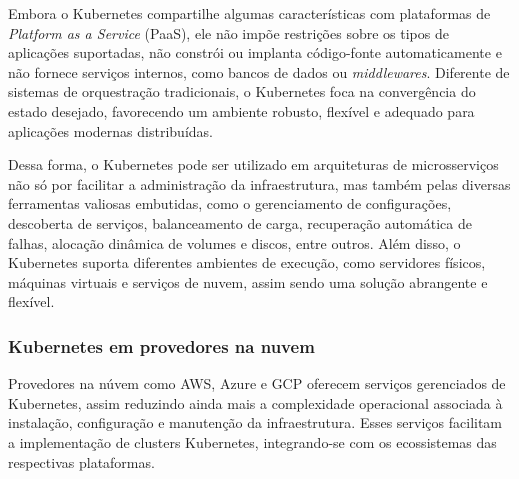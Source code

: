 Embora o Kubernetes compartilhe algumas características com plataformas de \emph{Platform as a Service} (PaaS), ele não impõe restrições sobre os tipos de aplicações suportadas, não constrói ou implanta código-fonte automaticamente e não fornece serviços internos, como bancos de dados ou \emph{middlewares}. Diferente de sistemas de orquestração tradicionais, o Kubernetes foca na convergência do estado desejado, favorecendo um ambiente robusto, flexível e adequado para aplicações modernas distribuídas.  \cite{kubernetes}

Dessa forma, o Kubernetes pode ser utilizado em arquiteturas de microsserviços não só por facilitar a administração da infraestrutura, mas também pelas diversas ferramentas valiosas embutidas, como o gerenciamento de configurações, descoberta de serviços, balanceamento de carga, recuperação automática de falhas, alocação dinâmica de volumes e discos, entre outros. Além disso, o Kubernetes suporta diferentes ambientes de execução, como servidores físicos, máquinas virtuais e serviços de nuvem, assim sendo uma solução abrangente e flexível.








\subsubsection*{Kubernetes em provedores na nuvem}
Provedores na núvem como AWS, Azure e GCP oferecem serviços gerenciados de Kubernetes, assim reduzindo ainda mais a complexidade operacional associada à instalação, configuração e manutenção da infraestrutura. Esses serviços facilitam a implementação de clusters Kubernetes, integrando-se com os ecossistemas das respectivas plataformas.

